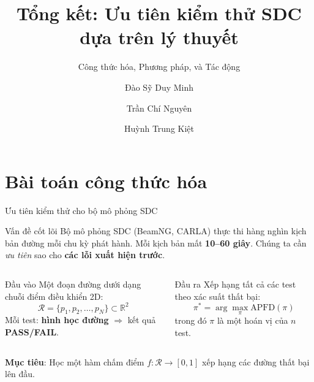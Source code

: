 \documentclass[aspectratio=169,10pt]{beamer}
\title{Tổng kết: Ưu tiên kiểm thử SDC dựa trên lý thuyết}
\subtitle{Công thức hóa, Phương pháp, và Tác động}
\author{Đào Sỹ Duy Minh \and Trần Chí Nguyên \and Huỳnh Trung Kiệt}
\institute{Đại học Khoa học Tự nhiên, ĐHQG-HCM \\[3pt]
           \footnotesize \textit{Dành cho NeurIPS 2026}}
\date{}
\begin{document}
\begin{frame}
\maketitle
\end{frame}

\section{Bài toán công thức hóa}

\begin{frame}{Ưu tiên kiểm thử cho bộ mô phỏng SDC}
\begin{block}{Vấn đề cốt lõi}
\small
Bộ mô phỏng SDC (BeamNG, CARLA) thực thi hàng nghìn kịch bản đường mỗi chu kỳ phát hành. Mỗi kịch bản mất \textbf{10--60 giây}. Chúng ta cần \emph{ưu tiên} sao cho \textbf{các lỗi xuất hiện trước}.
\end{block}

\begin{columns}[T]
\begin{block}{Đầu vào}
\small
Một đoạn đường dưới dạng chuỗi điểm điều khiển 2D:
\[
\mathcal{R} = \{p_1, p_2, \ldots, p_N\} \subset \mathbb{R}^2
\]
Mỗi test: \textbf{hình học đường} $\Rightarrow$ kết quả \textbf{PASS/FAIL}.
\end{block}

\begin{block}{Đầu ra}
\small
Xếp hạng tất cả các test theo xác suất thất bại:
\[
\pi^* = \arg\max_{\pi} \text{APFD}(\pi)
\]
trong đó $\pi$ là một hoán vị của $n$ test.
\end{block}
\end{columns}

\vspace{1em}
\centering
\textbf{Mục tiêu}: Học một hàm chấm điểm $f: \mathcal{R} \to [0,1]$ xếp hạng các đường thất bại lên đầu.
\end{frame}
\end{document}
